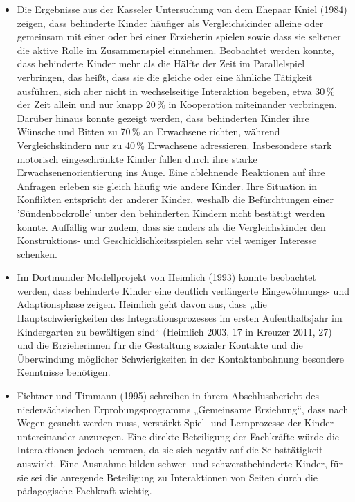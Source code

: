 \begin{itemize}
\item Die Ergebnisse aus der Kasseler Untersuchung von dem Ehepaar Kniel (1984) zeigen, dass behinderte Kinder häufiger als Vergleichskinder alleine oder gemeinsam mit einer oder bei einer Erzieherin spielen sowie dass sie seltener die aktive Rolle im Zusammenspiel einnehmen. Beobachtet werden konnte, dass behinderte Kinder mehr als die Hälfte der Zeit im Parallelspiel verbringen, das heißt, dass sie die gleiche oder eine ähnliche Tätigkeit ausführen, sich aber nicht in wechselseitige Interaktion begeben, etwa 30\,\% der Zeit allein und nur knapp 20\,\% in Kooperation miteinander verbringen. Darüber hinaus konnte gezeigt werden, dass behinderten Kinder ihre Wünsche und Bitten zu 70\,\% an Erwachsene richten, während Vergleichskindern nur zu 40\,\% Erwachsene adressieren. Insbesondere stark motorisch eingeschränkte Kinder fallen durch ihre starke Erwachsenenorientierung ins Auge. Eine ablehnende Reaktionen auf ihre Anfragen erleben sie gleich häufig wie andere Kinder. Ihre Situation in Konflikten entspricht der anderer Kinder, weshalb die Befürchtungen einer 'Sündenbockrolle' unter den behinderten Kindern nicht bestätigt werden konnte. Auffällig war zudem, dass sie anders als die Vergleichskinder den Konstruktions- und Geschicklichkeitsspielen sehr viel weniger Interesse schenken.

\item Im Dortmunder Modellprojekt von Heimlich (1993) konnte beobachtet werden, dass behinderte Kinder eine deutlich verlängerte Eingewöhnungs- und Adaptions\-phase zeigen. Heimlich geht davon aus, dass „die Hauptschwierigkeiten des Integrationsprozesses im ersten Aufenthaltsjahr im Kindergarten zu bewältigen sind“ (Heimlich 2003, 17 in Kreuzer 2011, 27) und die Erzieherinnen für die Gestaltung sozialer Kontakte und die Überwindung möglicher Schwierigkeiten in der Kontaktanbahnung besondere Kenntnisse benötigen.

\item Fichtner und Timmann (1995) schreiben in ihrem Abschlussbericht des niedersächsischen Erprobungsprogramms „Gemeinsame Erziehung“, dass nach Wegen gesucht werden muss, verstärkt Spiel- und Lernprozesse der Kinder untereinander anzuregen. Eine direkte Beteiligung der Fachkräfte würde die Interaktionen jedoch hemmen, da sie sich negativ auf die Selbsttätigkeit auswirkt. Eine Ausnahme bilden schwer- und schwerstbehinderte Kinder, für sie sei die anregende Beteiligung zu Interaktionen von Seiten durch die pädagogische Fachkraft wichtig. 


\end{itemize}
